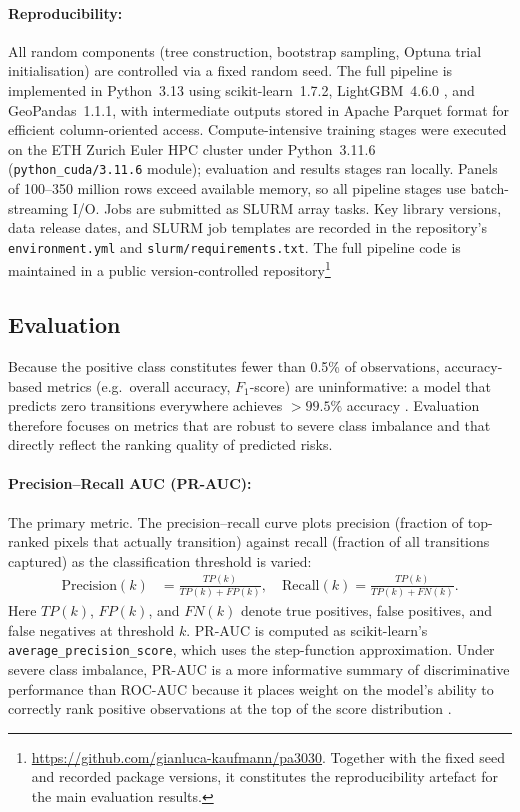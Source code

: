 \documentclass[12pt]{article}
\theoremstyle{break}
\begin{document}
\paragraph{Reproducibility:}
All random components (tree construction, bootstrap sampling, Optuna trial
initialisation) are controlled via a fixed random seed. The full
pipeline is implemented in Python~3.13 using scikit-learn~1.7.2, LightGBM~4.6.0
\citep{ke2017,pedregosa2011}, and GeoPandas~1.1.1, with intermediate outputs stored in
Apache Parquet format for efficient column-oriented access. Compute-intensive training
stages were executed on the ETH Zurich Euler HPC cluster under Python~3.11.6
(\texttt{python\_cuda/3.11.6} module); evaluation and results stages ran locally.
Panels of 100--350 million rows exceed available memory, so all pipeline stages use
batch-streaming I/O. Jobs are submitted as SLURM array tasks.
Key library versions, data release dates, and SLURM job templates are recorded in the
repository's \texttt{environment.yml} and \texttt{slurm/requirements.txt}.
The full pipeline code is maintained in a public version-controlled
repository\footnote{\url{https://github.com/gianluca-kaufmann/pa3030}. Together with the fixed seed and recorded package versions, it constitutes the reproducibility artefact for the main evaluation results.}

\subsection{Evaluation} 
\label{sec:metrics}

Because the positive class constitutes fewer than 0.5\% of observations, accuracy-based
metrics (e.g.\ overall accuracy, $F_1$-score) are uninformative: a model that predicts
zero transitions everywhere achieves $> 99.5\%$ accuracy \citep{davis2006}. Evaluation
therefore focuses on metrics that are robust to severe class imbalance and that
directly reflect the ranking quality of predicted risks.

\paragraph{Precision--Recall AUC (PR-AUC):}
The primary metric. The precision--recall curve plots precision (fraction of top-ranked
pixels that actually transition) against recall (fraction of all transitions captured)
as the classification threshold is varied:
\begin{align}
  \text{Precision}(k) &= \frac{TP(k)}{TP(k) + FP(k)}, \quad
  \text{Recall}(k) = \frac{TP(k)}{TP(k) + FN(k)}.
\end{align}
Here $TP(k)$, $FP(k)$, and $FN(k)$ denote true positives, false positives, and false
negatives at threshold $k$. PR-AUC is computed as scikit-learn's \texttt{average\_precision\_score}, which uses
the step-function approximation.
Under severe class imbalance, PR-AUC is a more informative summary of discriminative
performance than ROC-AUC because it places weight on the model's ability to correctly
rank positive observations at the top of the score distribution \citep{davis2006}.
\end{document}
